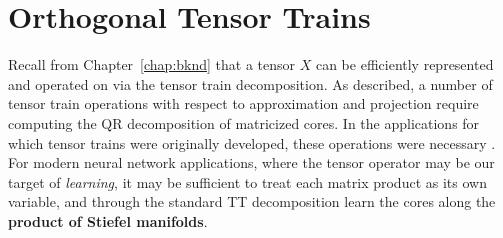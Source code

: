 \section{Orthogonal Tensor Trains}\label{sec:ott}
Recall from Chapter~\ref{chap:bknd} that a tensor $X$ can be efficiently represented and operated on via the tensor train decomposition.
As described, a number of tensor train operations with respect to approximation and projection require computing the QR decomposition of matricized cores. In the applications for which tensor trains were originally developed, these operations were necessary \citep{oseledets2011tensor,klus2018tensor}. For modern neural network applications, where the tensor operator may be our target of \textit{learning}, it may be sufficient to treat each matrix product as its own variable, and through the standard TT decomposition learn the cores along the \textbf{product of Stiefel manifolds}.


